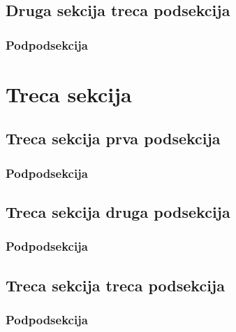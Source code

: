 \documentclass{viser-thesis}
\begin{document}
\subsection{Druga sekcija treca podsekcija}
\newpage
\subsubsection{Podpodsekcija}
\newpage

\section{Treca sekcija}
\newpage
\subsection{Treca sekcija prva podsekcija}
\newpage
\subsubsection{Podpodsekcija}
\newpage
\subsection{Treca sekcija druga podsekcija}
\newpage
\subsubsection{Podpodsekcija}
\newpage
\subsection{Treca sekcija treca podsekcija}
\newpage
\subsubsection{Podpodsekcija}
\end{document}

